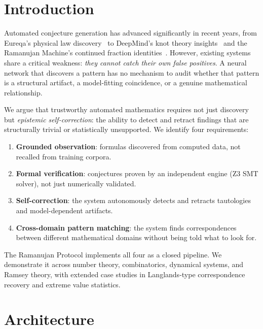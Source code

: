 \documentclass[11pt,a4paper]{article}
\begin{document}
\section{Introduction}
\label{sec:intro}

Automated conjecture generation has advanced significantly in recent
years, from Eureqa's physical law discovery~\citep{schmidt2009} to
DeepMind's knot theory insights~\citep{davies2021} and the Ramanujan
Machine's continued fraction identities~\citep{raayoni2021}. However,
existing systems share a critical weakness: \emph{they cannot catch
their own false positives}. A neural network that discovers a pattern
has no mechanism to audit whether that pattern is a structural artifact,
a model-fitting coincidence, or a genuine mathematical relationship.

We argue that trustworthy automated mathematics requires not just
discovery but \emph{epistemic self-correction}: the ability to detect
and retract findings that are structurally trivial or statistically
unsupported. We identify four requirements:
\begin{enumerate}
  \item \textbf{Grounded observation}: formulas discovered from computed
    data, not recalled from training corpora.
  \item \textbf{Formal verification}: conjectures proven by an
    independent engine (Z3 SMT solver), not just numerically validated.
  \item \textbf{Self-correction}: the system autonomously detects and
    retracts tautologies and model-dependent artifacts.
  \item \textbf{Cross-domain pattern matching}: the system finds
    correspondences between different mathematical domains without being
    told what to look for.
\end{enumerate}

The Ramanujan Protocol implements all four as a closed pipeline. We
demonstrate it across number theory, combinatorics, dynamical systems,
and Ramsey theory, with extended case studies in Langlands-type
correspondence recovery and extreme value statistics.


\section{Architecture}
\label{sec:architecture}
\end{document}
